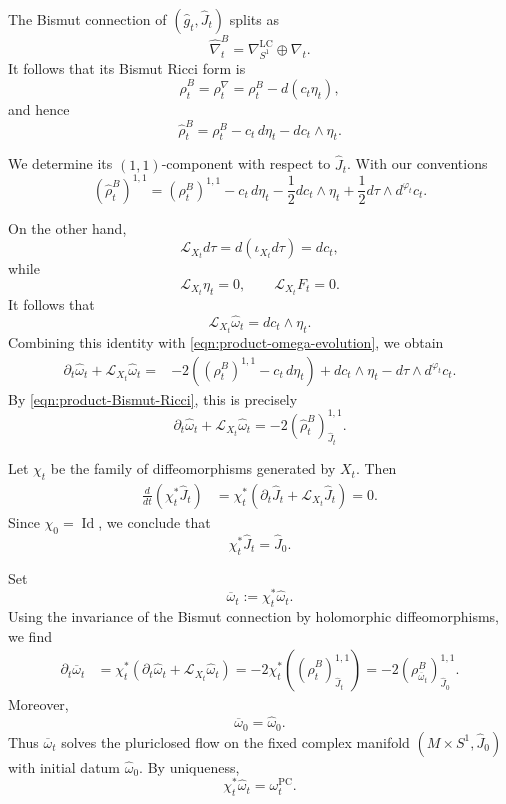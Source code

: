 \documentclass{article}
\makeatletter
\renewenvironment{proof}[1][\proofname]{%
  \par\pushQED{\qed}%
  \normalfont\topsep6\p@\@plus6\p@\relax
  \trivlist
  \item[\hskip\labelsep
        \textbf{\textup{#1}}\@addpunct{.}]\ignorespaces
}{%
  \popQED\endtrivlist\@endpefalse
}
\theoremstyle{definition}
\numberwithin{equation}{section}
\makeatother
\begin{document}
\begin{proof}
The Bismut connection of
$(\widehat g_t,\widehat J_t)$ splits as
\[
\widehat\nabla_t^B
=
\nabla^{\mathrm{LC}}_{S^1}\oplus\nabla_t.
\]
It follows that its Bismut Ricci form is
\[
\widehat\rho_t^B
=
\rho_t^\nabla
=
\rho_t^B-d(c_t\eta_t),
\]
and hence
\[
\widehat\rho_t^B
=
\rho_t^B-c_t\,d\eta_t-dc_t\wedge\eta_t.
\]

We determine its $(1,1)$-component with respect to
$\widehat J_t$. With our conventions
\begin{equation}
\label{eqn:product-Bismut-Ricci}
\left(\widehat\rho_t^B\right)^{1,1}
=
(\rho_t^B)^{1,1}
-
c_t\,d\eta_t
-
\frac12dc_t\wedge\eta_t
+
\frac12d\tau\wedge d^{\varphi_t}c_t.
\end{equation}

On the other hand,
\[
\mathcal L_{X_t}d\tau
=
d(\iota_{X_t}d\tau)
=
dc_t,
\]
while
\[
\mathcal L_{X_t}\eta_t=0,
\qquad
\mathcal L_{X_t}F_t=0.
\]
It follows that
\[
\mathcal L_{X_t}\widehat\omega_t
=
dc_t\wedge\eta_t.
\]
Combining this identity with
\eqref{eqn:product-omega-evolution}, we obtain
\[
\begin{aligned}
\partial_t\widehat\omega_t
+
\mathcal L_{X_t}\widehat\omega_t
={}&
-2\left((\rho_t^B)^{1,1}-c_t\,d\eta_t\right)
+
dc_t\wedge\eta_t
-
d\tau\wedge d^{\varphi_t}c_t.
\end{aligned}
\]
By \eqref{eqn:product-Bismut-Ricci}, this is precisely
\[
\partial_t\widehat\omega_t
+
\mathcal L_{X_t}\widehat\omega_t
=
-2\left(\widehat\rho_t^B\right)^{1,1}_{\widehat J_t}.
\]

Let $\chi_t$ be the family of diffeomorphisms generated by $X_t$.
Then
\[
\begin{aligned}
\frac{d}{dt}\left(\chi_t^*\widehat J_t\right)
&=
\chi_t^*
\left(
\partial_t\widehat J_t
+
\mathcal L_{X_t}\widehat J_t
\right)=0.
\end{aligned}
\]
Since $\chi_0=\operatorname{Id}$, we conclude that
\[
\chi_t^*\widehat J_t=\widehat J_0.
\]

Set
\[
\overline\omega_t:=\chi_t^*\widehat\omega_t.
\]
Using the invariance of the Bismut connection by holomorphic diffeomorphisms, we find
\[
\begin{aligned}
\partial_t\overline\omega_t
&=
\chi_t^*
\left(
\partial_t\widehat\omega_t
+
\mathcal L_{X_t}\widehat\omega_t
\right)=
-2\chi_t^*
\left(
\left(\widehat\rho_t^B\right)^{1,1}_{\widehat J_t}
\right)=
-2\left(
\rho^B_{\overline\omega_t}
\right)^{1,1}_{\widehat J_0}.
\end{aligned}
\]
Moreover,
\[
\overline\omega_0=\widehat\omega_0.
\]
Thus $\overline\omega_t$ solves the pluriclosed flow on the fixed
complex manifold $(M\times S^1,\widehat J_0)$ with initial datum
$\widehat\omega_0$. By uniqueness,
\[
\chi_t^*\widehat\omega_t
=
\omega_t^{\mathrm{PC}}.
\]
 \end{proof}
\end{document}
